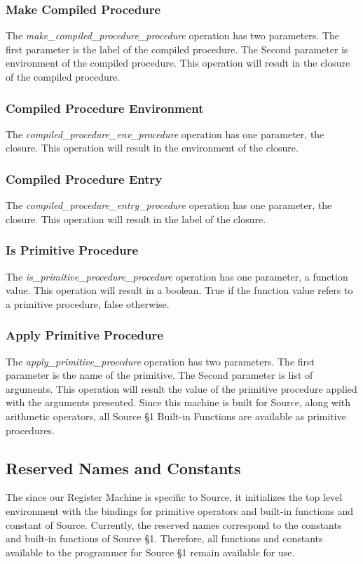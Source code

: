 \subsubsection{Make Compiled Procedure}
The \textit{ make\_compiled\_procedure\_procedure} operation has two parameters.
The first parameter is the label of the compiled procedure. The Second parameter is environment of the compiled procedure.
This operation will result in the closure of the compiled procedure.

\subsubsection{Compiled Procedure Environment}
The \textit{ compiled\_procedure\_env\_procedure} operation has one parameter, the closure.
This operation will result in the environment of the closure.

\subsubsection{Compiled Procedure Entry}
The \textit{ compiled\_procedure\_entry\_procedure} operation has one parameter, the closure.
This operation will result in the label of the closure.

\subsubsection{Is Primitive Procedure}
The \textit{ is\_primitive\_procedure\_procedure} operation has one parameter, a function value.
This operation will result in a boolean. True if the function value refers to a primitive procedure, false otherwise.

\subsubsection{Apply Primitive Procedure}
The \textit{ apply\_primitive\_procedure} operation has two parameters.
The first parameter is the name of the primitive. The Second parameter is list of arguments.
This operation will result the value of the primitive procedure applied with the arguments presented. Since this machine is built for Source, along with arithmetic operators, all Source \S 1 Built-in Functions are available as primitive procedures.

\subsection{Reserved Names and Constants}
The since our Register Machine is specific to Source, it initializes the top level environment with the bindings for primitive operators and built-in functions and constant of Source. Currently, the reserved names correspond to the constants and built-in functions of Source \S 1. Therefore, all functions and constants available to the programmer for Source \S 1 remain available for use.
